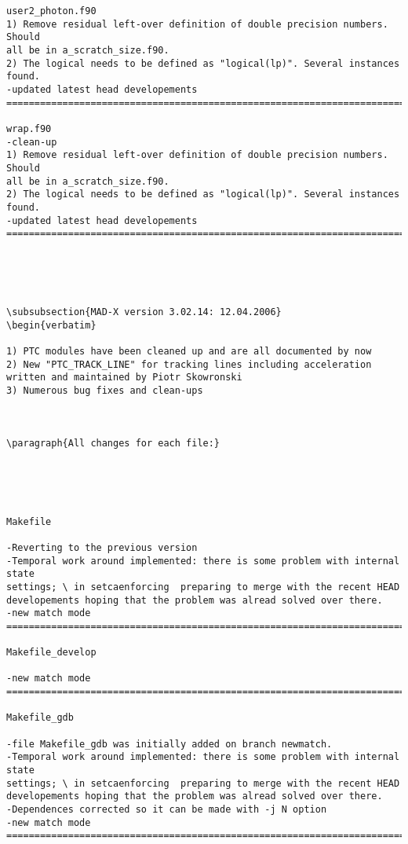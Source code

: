 \begin{verbatim}
user2_photon.f90
1) Remove residual left-over definition of double precision numbers. Should
all be in a_scratch_size.f90.
2) The logical needs to be defined as "logical(lp)". Several instances found.
-updated latest head developements
=============================================================================

wrap.f90
-clean-up
1) Remove residual left-over definition of double precision numbers. Should
all be in a_scratch_size.f90.
2) The logical needs to be defined as "logical(lp)". Several instances found.
-updated latest head developements
=============================================================================





\subsubsection{MAD-X version 3.02.14: 12.04.2006}
\begin{verbatim}

1) PTC modules have been cleaned up and are all documented by now
2) New "PTC_TRACK_LINE" for tracking lines including acceleration
written and maintained by Piotr Skowronski
3) Numerous bug fixes and clean-ups



\paragraph{All changes for each file:}





Makefile

-Reverting to the previous version
-Temporal work around implemented: there is some problem with internal state
settings; \ in setcaenforcing  preparing to merge with the recent HEAD
developements hoping that the problem was alread solved over there.
-new match mode
=============================================================================

Makefile_develop

-new match mode
=============================================================================

Makefile_gdb

-file Makefile_gdb was initially added on branch newmatch.
-Temporal work around implemented: there is some problem with internal state
settings; \ in setcaenforcing  preparing to merge with the recent HEAD
developements hoping that the problem was alread solved over there.
-Dependences corrected so it can be made with -j N option
-new match mode
=============================================================================


\end{verbatim}
